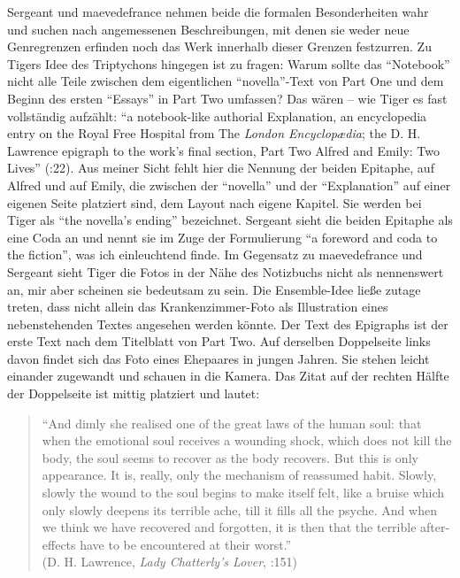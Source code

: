 \documentclass[fontsize=12pt]{scrartcl}
\begin{document}
Sergeant und maevedefrance nehmen beide die formalen Besonderhei\-ten wahr und suchen nach angemessenen Beschreibungen, mit denen sie weder neue Genregrenzen erfinden noch das Werk innerhalb dieser Grenzen festzurren. Zu Tigers Idee des Triptychons hingegen ist zu fragen: Warum sollte das "`Notebook"' nicht alle Teile zwischen dem eigentlichen "`novella"'-Text von Part One und dem Beginn des ersten "`Essays"' in Part Two umfassen? Das w\"aren -- wie Tiger es fast vollst\"andig aufz\"ahlt: "`a notebook-like authorial Explanation, an encyclopedia entry on the Royal Free Hospital from The \textit{London Encyclop{\ae}dia}; the D. H. Lawrence epigraph to the work's final section, Part Two Alfred and Emily: Two Lives"' (\cite{Tiger2009}:22). Aus meiner Sicht fehlt \mbox{hier} die Nennung der beiden Epitaphe, auf Alfred und auf Emily, die zwischen der "`novella"' und der "`Explanation"' auf einer eigenen Seite platziert sind, dem Layout nach eigene Kapitel. Sie werden bei Tiger als "`the novella's ending"' be\-zeichnet. Sergeant sieht die beiden Epitaphe als eine Coda an und \mbox{nennt} sie im Zuge der Formulierung "`a foreword and coda to the fiction"', was ich einleuchtend finde. Im Gegensatz zu maevedefrance und Sergeant sieht Tiger die Fotos in der N\"ahe des Notizbuchs nicht als nennenswert an, mir aber scheinen sie bedeutsam zu sein. Die Ensemble-Idee lie{\ss}e zutage treten, dass nicht allein das Krankenzimmer-Foto als Illustration eines nebenstehenden Textes angesehen werden k\"onnte. Der Text des Epigraphs ist der erste Text nach dem Titelblatt von Part Two. Auf derselben Doppelseite links davon findet sich das Foto eines Ehepaares in jungen Jahren. Sie stehen leicht einander zugewandt und schauen in die Kamera. Das Zitat auf der rechten H\"alfte der Doppelseite ist mittig platziert und lautet:

\singlespacing
\begin{quote}
"`And dimly she realised one of the great laws of the human soul: that when the emotional soul receives a wounding shock, which does not kill the body, the soul seems to recover as the body recovers. But this is only appearance. It is, really, only the mechanism of reassumed habit. Slowly, slowly the wound to the soul begins to make itself felt, like a bruise which only slowly deepens its terrible ache, till it fills all the psyche. And when we think we have recovered and forgotten, it is then that the terrible after-effects have to be encountered at their worst."'\\(D. H. Lawrence, \textit{Lady Chatterly's Lover}, \cite{Lessing2008}:151)
\end{quote} 
\onehalfspacing
\end{document}
